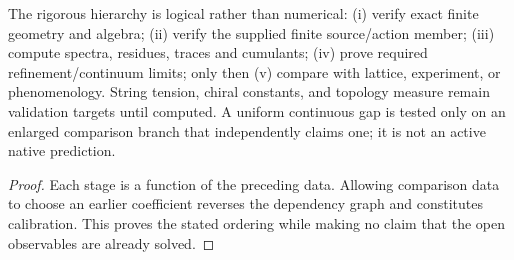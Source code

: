 \documentclass[12pt,a4paper]{article}
\begin{document}
\begin{theorem}
\label{p11:thm:qcd-validation-hierarchy}

The rigorous hierarchy is logical rather than numerical: (i) verify exact finite geometry and algebra; (ii) verify the supplied finite source/action member; (iii) compute spectra, residues, traces and cumulants; (iv) prove required refinement/continuum limits; only then (v) compare with lattice, experiment, or phenomenology.  String tension, chiral constants, and topology measure remain validation targets until computed.  A uniform continuous gap is tested only on an enlarged comparison branch that independently claims one; it is not an active native prediction.
\label{p11:eq:minimal-validation-target-triplet}
\label{p11:eq:strong-validation-targets}
\end{theorem}
\begin{proof}

Each stage is a function of the preceding data.  Allowing comparison data to choose an earlier coefficient reverses the dependency graph and constitutes calibration.  This proves the stated ordering while making no claim that the open observables are already solved.
\end{proof}
\end{document}
